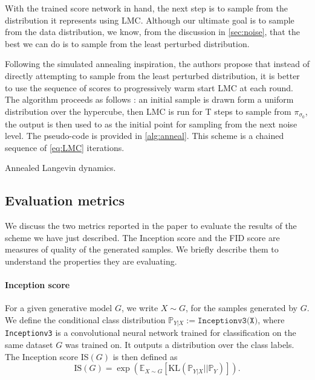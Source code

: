 \documentclass[10pt,journal,a4paper]{IEEEtran}
\theoremstyle{definition}
\newcommand{\Prb}{\mathbb{P}}
\newcommand{\E}{\mathbb{E}}
\newcommand{\bfx}{\mathbf{x}}
\newcommand{\KL}{\text{KL}}
\begin{document}
With the trained score network in hand, the next step is to sample from the distribution it represents using LMC. Although our ultimate goal is to sample from the data distribution, we know, from the discussion in \ref{sec:noise}, that the best we can do is to sample from the least perturbed distribution.

Following the simulated annealing inspiration, the authors propose that instead of directly attempting to sample from the least perturbed distribution, it is better to use the sequence of scores to progressively warm start LMC at each round. The algorithm proceeds as follows : an initial sample is drawn form a uniform distribution over the hypercube, then LMC is run for T steps to sample from $\pi_{\sigma_0}$, the output is then used to as the initial point for sampling from the next noise level. The pseudo-code is provided in \ref{alg:anneal}. This scheme is a chained sequence of \eqref{eq:LMC} iterations.

\begin{algorithm}
	\caption{Annealed Langevin dynamics.}
	\label{alg:anneal}
	\begin{algorithmic}[1]
	    \STATE{Initialize $\tilde{\bfx}_0$}
	         
                \STATE{{$\tilde{\bfx}_{t} \gets \tilde{\bfx}_{t-1} + \eta_i s_\theta(\tilde{\bfx}_{t-1}, \sigma_i) + \sqrt{2\eta_i}~ z_t$}}
            \ENDFOR
            \STATE{$\tilde{\bfx}_0 \gets \tilde{\bfx}_T$}
        \ENDFOR
        \STATE{ \Return $\tilde{\bfx}_T$}
	\end{algorithmic}
\end{algorithm}


\subsection{Evaluation metrics}

We discuss the two metrics reported in the paper to evaluate the results of the scheme we have just described. The Inception score and the FID score are measures of quality of the generated samples. We briefly describe them to understand the properties they are evaluating.

\paragraph{Inception score} \cite{salimans_improved_2016} For a given generative model $G$, we write $X \sim G$, for the samples generated by $G$. We define the conditional class distribution $\Prb_{Y|X} := \texttt{Inceptionv3(X)}$, where \texttt{Inceptionv3} is a convolutional neural network trained for classification on the same dataset $G$ was trained on. It outputs a distribution over the class labels. The Inception score IS$(G)$ is then defined as 
\[
\text{IS}(G) = \exp \left(\E_{X \sim G} [\KL(\Prb_{Y|X} || \Prb_Y)] \right).
\]
\end{document}
